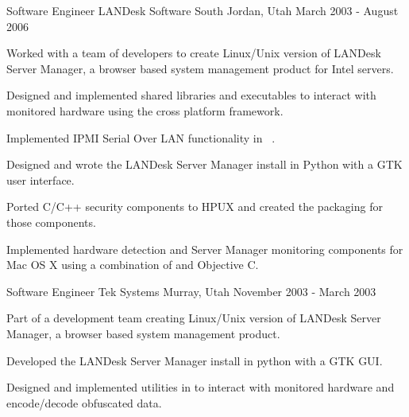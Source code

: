 \begin{cventries}
\cventry
{Software Engineer} %
{LANDesk Software} %
{South Jordan, Utah} %
{March 2003 - August 2006} %
{
	\begin{cvitems} %
		\item {Worked with a team of developers to create Linux/Unix version of LANDesk Server Manager, a browser based system management product for Intel servers.}
		\item {Designed and implemented shared libraries and executables to interact with monitored hardware using the cross platform \Cpp{} framework.}
		\item {Implemented IPMI Serial Over LAN functionality in \
			\Cpp{}.}
		\item {Designed and wrote the LANDesk Server Manager install in Python with a GTK user interface.}
		\item {Ported C/C++ security components to HPUX and created the packaging for those components.}
		\item {Implemented hardware detection and Server Manager monitoring components for Mac OS X using a combination of \Cpp{} and Objective C.}
	\end{cvitems}
}

\cventry
{Software Engineer}
{Tek Systems}
{Murray, Utah}
{November 2003 - March 2003}
{
	\begin{cvitems} %
		\item {Part of a development team creating Linux/Unix version of LANDesk Server Manager, a browser based system management product.}
		\item {Developed the LANDesk Server Manager install in python with a GTK GUI.}
		\item {Designed and implemented utilities in \Cpp{} to interact with monitored hardware and encode/decode obfuscated data.}
	\end{cvitems}
}


\end{cventries}
